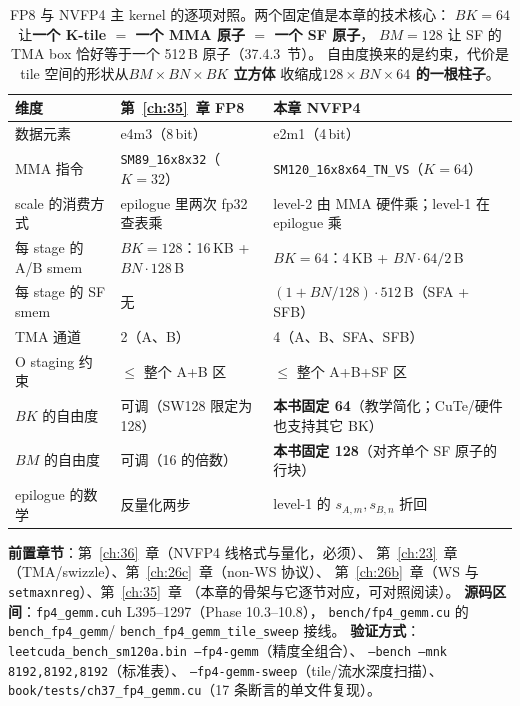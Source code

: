 \begin{table}[H]
\centering
\footnotesize
\begin{tabular}{lll}
\toprule
维度 & 第~\ref{ch:35}~章 FP8 & 本章 NVFP4 \\
\midrule
数据元素 & e4m3（8\,bit） & e2m1（4\,bit） \\
MMA 指令 & \texttt{SM89\_16x8x32}（$K{=}32$） & \texttt{SM120\_16x8x64\_TN\_VS}（$K{=}64$） \\
scale 的消费方式 & epilogue 里两次 fp32 查表乘 & level-2 由 MMA 硬件乘；level-1 在 epilogue 乘 \\
每 stage 的 A/B smem & $BK{=}128$：16\,KB + $BN{\cdot}128$\,B & $BK{=}64$：4\,KB + $BN{\cdot}64/2$\,B \\
每 stage 的 SF smem & 无 & $(1+BN/128)\cdot512\,\mathrm{B}$（SFA + SFB） \\
TMA 通道 & 2（A、B） & 4（A、B、SFA、SFB） \\
O staging 约束 & $\le$ 整个 A+B 区 & $\le$ 整个 A+B+SF 区 \\
$BK$ 的自由度 & 可调（SW128 限定为 128） & \textbf{本书固定 64}（教学简化；CuTe/硬件也支持其它 BK） \\
$BM$ 的自由度 & 可调（16 的倍数） & \textbf{本书固定 128}（对齐单个 SF 原子的行块） \\
epilogue 的数学 & 反量化两步 & level-1 的 $s_{A,m},s_{B,n}$ 折回 \\
\bottomrule
\end{tabular}
\caption{FP8 与 NVFP4 主 kernel 的逐项对照。两个固定值是本章的技术核心：
$BK{=}64$ 让\textbf{一个 K-tile $=$ 一个 MMA 原子 $=$ 一个 SF 原子}，
$BM{=}128$ 让 SF 的 TMA box 恰好等于一个 512\,B 原子（37.4.3~节）。
自由度换来的是约束，代价是 tile 空间的形状从\textbf{$BM\times BN\times BK$ 立方体}
收缩成\textbf{$128\times BN\times 64$ 的一根柱子}。}
\label{tab:37-fp8-vs-fp4}
\end{table}

\textbf{前置章节}：第~\ref{ch:36}~章（NVFP4 线格式与量化，必须）、
第~\ref{ch:23}~章（TMA/swizzle）、第~\ref{ch:26c}~章（non-WS 协议）、
第~\ref{ch:26b}~章（WS 与 \texttt{setmaxnreg}）、第~\ref{ch:35}~章
（本章的骨架与它逐节对应，可对照阅读）。
\textbf{源码区间}：\texttt{fp4\_gemm.cuh} L395--1297（Phase 10.3--10.8），
\texttt{bench/fp4\_gemm.cu} 的 \texttt{bench\_fp4\_gemm}/
\texttt{bench\_fp4\_gemm\_tile\_sweep} 接线。
\textbf{验证方式}：\texttt{leetcuda\_bench\_sm120a.bin --fp4-gemm}（精度全组合）、
\texttt{--bench --mnk 8192,8192,8192}（标准表）、
\texttt{--fp4-gemm-sweep}（tile/流水深度扫描）、
\texttt{book/\allowbreak tests/\allowbreak ch37\_fp4\_gemm.cu}（17 条断言的单文件复现）。

